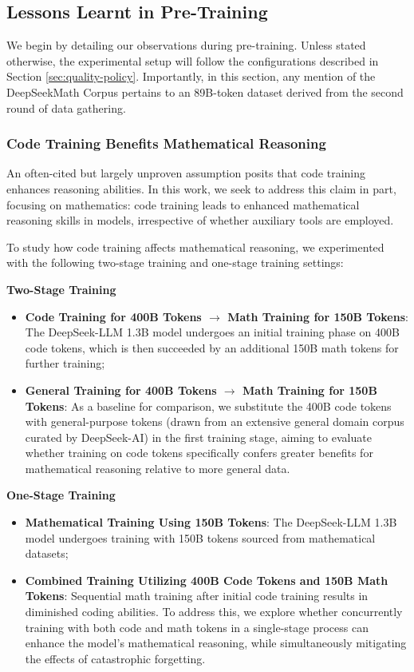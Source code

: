 \begin{itemize}[topsep=0pt]
\subsection{Lessons Learnt in Pre-Training}

We begin by detailing our observations during pre-training. Unless stated otherwise, the experimental setup will follow the configurations described in Section \ref{sec:quality-policy}. Importantly, in this section, any mention of the DeepSeekMath Corpus pertains to an 89B-token dataset derived from the second round of data gathering.

\subsubsection{Code Training Benefits Mathematical Reasoning}

An often-cited but largely unproven assumption posits that code training enhances reasoning abilities. In this work, we seek to address this claim in part, focusing on mathematics: code training leads to enhanced mathematical reasoning skills in models, irrespective of whether auxiliary tools are employed.

To study how code training affects mathematical reasoning, we experimented with the following two-stage training and one-stage training settings:

\textbf{Two-Stage Training}

\begin{itemize}[topsep=0pt]
    \item \textbf{Code Training for 400B Tokens $\rightarrow$ Math Training for 150B Tokens}: The DeepSeek-LLM 1.3B model undergoes an initial training phase on 400B code tokens, which is then succeeded by an additional 150B math tokens for further training;
    \item \textbf{General Training for 400B Tokens $\rightarrow$ Math Training for 150B Tokens}: As a baseline for comparison, we substitute the 400B code tokens with general-purpose tokens (drawn from an extensive general domain corpus curated by DeepSeek-AI) in the first training stage, aiming to evaluate whether training on code tokens specifically confers greater benefits for mathematical reasoning relative to more general data.
\end{itemize}

\textbf{One-Stage Training}

\begin{itemize}[topsep=0pt]
    \item \textbf{Mathematical Training Using 150B Tokens}: The DeepSeek-LLM 1.3B model undergoes training with 150B tokens sourced from mathematical datasets;
    \item \textbf{Combined Training Utilizing 400B Code Tokens and 150B Math Tokens}: Sequential math training after initial code training results in diminished coding abilities. To address this, we explore whether concurrently training with both code and math tokens in a single-stage process can enhance the model's mathematical reasoning, while simultaneously mitigating the effects of catastrophic forgetting.
\end{itemize}


\end{itemize}
